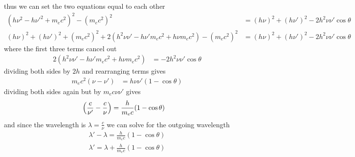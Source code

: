 \documentclass[../main.tex]{subfiles}
\begin{document}
thus we can set the two equations equal to each other
\begin{align*}
    (h\nu^2 - h\nu'^2 + m_e c^2)^2 - (m_e c^2)^2 &= 
        (h\nu)^2 + (h\nu')^2 - 2 h^2 \nu \nu' \cos \theta \\
    (h\nu)^2 + (h\nu')^2 + (m_e c^2)^2 + 2(h^2 \nu \nu' - h\nu' m_e c^2 + h\nu m_e c^2) - (m_ec^2)^2
        &= (h\nu)^2 + (h\nu')^2 - 2 h^2 \nu \nu' \cos \theta
\end{align*}
where the first three terms cancel out
\begin{align*}
    2(h^2 \nu \nu' - h\nu' m_e c^2 + h\nu m_e c^2) &= - 2 h^2 \nu \nu' \cos \theta
\end{align*}
dividing both sides by $2h$ and rearranging terms gives
\begin{align*}
    m_e c^2 (\nu - \nu') &= h \nu \nu' (1 - \cos \theta)
\end{align*}
dividing both sides again but by $m_e c \nu \nu'$ gives
\begin{align*}
    \qt(\frac{c}{\nu'} - \frac{c}{\nu}) &= \frac{h}{m_e c} (1 - \cos \theta)
\end{align*}
and since the wavelength is $\lambda = \frac{c}{\nu}$ we can solve for the outgoing wavelength
\begin{align*}
    \lambda' - \lambda = \frac{h}{m_e c} (1 - \cos \theta) \\
    \boxed{
        \lambda' = \lambda + \frac{h}{m_e c} (1 - \cos \theta)
    }
\end{align*}
\end{document}
